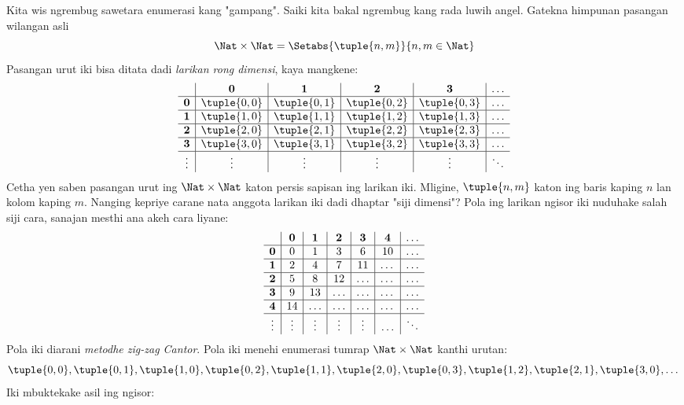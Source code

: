 \documentclass[../../../include/open-logic-section]{subfiles}
\begin{document}


\begin{explain}
Kita wis ngrembug sawetara enumerasi kang "gampang". Saiki kita bakal
ngrembug kang rada luwih angel. Gatekna himpunan pasangan wilangan
asli
\[
\Nat \times \Nat = \Setabs{\tuple{n,m}}{n,m \in \Nat}
\]
Pasangan urut iki bisa ditata dadi \emph{larikan rong dimensi}, kaya mangkene:
\[
\begin{array}{ c | c | c | c | c | c}
& \mathbf 0 & \mathbf 1 & \mathbf 2 & \mathbf 3 & \dots \\
\hline
\mathbf 0 & \tuple{0,0} & \tuple{0,1} & \tuple{0,2} & \tuple{0,3} & \dots \\
\hline
\mathbf 1 & \tuple{1,0} & \tuple{1,1} & \tuple{1,2} & \tuple{1,3} & \dots \\
\hline
\mathbf 2 & \tuple{2,0} & \tuple{2,1} & \tuple{2,2} & \tuple{2,3} & \dots \\
\hline
\mathbf 3 & \tuple{3,0} & \tuple{3,1} & \tuple{3,2} & \tuple{3,3} & \dots \\
\hline
\vdots & \vdots & \vdots & \vdots & \vdots & \ddots\\
\end{array}
\]
Cetha yen saben pasangan urut ing $\Nat \times \Nat$ katon
persis sapisan ing larikan iki. Mligine, $\tuple{n,m}$ katon ing
baris kaping $n$ lan kolom kaping $m$. Nanging kepriye carane nata
anggota larikan iki dadi dhaptar "siji dimensi"? Pola ing larikan ngisor iki
nuduhake salah siji cara, sanajan mesthi ana akeh cara liyane:
\[
\begin{array}{ c | c | c | c | c | c | c}
& \mathbf 0 & \mathbf 1 & \mathbf 2 & \mathbf 3 & \mathbf 4 &\dots \\
\hline
\mathbf 0 & 0  & 1& 3 & 6& 10 &\ldots \\
\hline
\mathbf 1 &2 & 4& 7 & 11 & \dots &\ldots \\
\hline
\mathbf 2 & 5 & 8 & 12 & \ldots & \dots&\ldots \\
\hline
\mathbf 3 & 9 & 13 & \ldots & \ldots & \dots & \ldots \\
\hline
\mathbf 4 & 14 & \ldots & \ldots & \ldots & \dots & \ldots \\
\hline
\vdots & \vdots & \vdots & \vdots & \vdots&\ldots & \ddots\\
\end{array}
\]\noindent
Pola iki diarani \emph{metodhe zig-zag Cantor}. Pola iki menehi
enumerasi tumrap $\Nat \times \Nat$ kanthi urutan:
\[
\tuple{0,0}, \tuple{0,1}, \tuple{1,0}, \tuple{0,2}, \tuple{1,1},
\tuple{2,0}, \tuple{0,3}, \tuple{1,2}, \tuple{2,1}, \tuple{3,0}, \dots
\]
Iki mbuktekake asil ing ngisor:
\end{explain}
\end{document}
